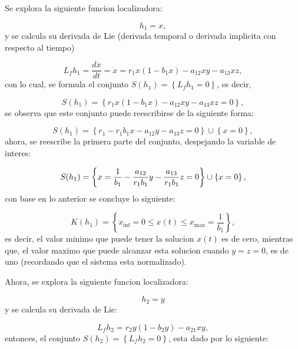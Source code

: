 \documentclass[letterpaper,11pt]{article}
\begin{document}
Se explora la siguiente funcion localizadora:

\begin{equation*}
h_{1}=x,
\end{equation*}%
y se calcula su derivada de Lie (derivada temporal o derivada implicita con
respecto al tiempo)

\begin{equation*}
L_{f}h_{1}=\frac{dx}{dt}=\dot{x}=r_{1}x(1-b_{1}x)-a_{12}xy-a_{13}xz,
\end{equation*}%
con lo cual, se formula el conjunto $S\left( h_{1}\right) =\left\{
L_{f}h_{1}=0\right\} $, es decir,

\begin{equation*}
S(h_{1})=\left\{ r_{1}x(1-b_{1}x)-a_{12}xy-a_{13}xz=0\right\} ,
\end{equation*}
$\allowbreak $se observa que este conjunto puede reescribirse de la
siguiente forma:

\begin{equation*}
S(h_{1})=\left\{ r_{1}-r_{1}b_{1}x-a_{12}y-a_{13}z=0\right\} \cup \left\{
x=0\right\} ,
\end{equation*}%
ahora, se reescribe la primera parte del conjunto, despejando la variable de
interes:

\begin{equation*}
S(h_{1})=\left\{ x=\frac{1}{b_{1}}-\frac{a_{12}}{r_{1}b_{1}}y-\frac{a_{13}}{%
r_{1}b_{1}}z=0\right\} \cup \left\{ x=0\right\} ,
\end{equation*}%
con base en lo anterior se concluye lo siguiente:

\begin{equation*}
K\left( h_{1}\right) =\left\{ x_{\inf }=0\leq x\left( t\right) \leq x_{\max
}=\frac{1}{b_{1}}\right\} ,
\end{equation*}%
es decir, el valor minimo que puede tener la solucion $x\left( t\right) $ es
de cero, mientras que, el valor maximo que puede alcanzar esta solucion
cuando $y=z=0$, es de uno (recordando que el sistema esta normalizado).

\bigskip

Ahora, se explora la siguiente funcion localizadora:

\begin{equation*}
h_{2}=y
\end{equation*}%
y se calcula su derivada de Lie:

\begin{equation*}
L_{f}h_{2}=r_{2}y(1-b_{2}y)-a_{21}xy,
\end{equation*}%
entonces, el conjunto $S\left( h_{2}\right) =\left\{ L_{f}h_{2}=0\right\} $,
esta dado por lo siguiente:
\end{document}
